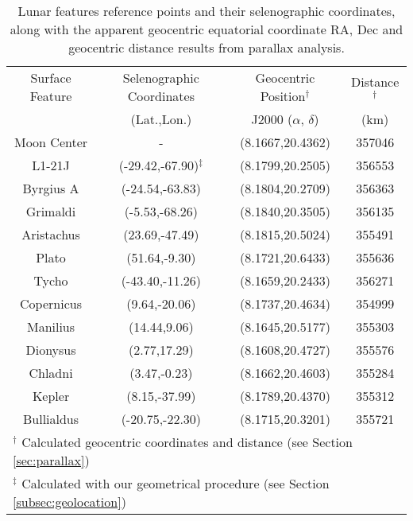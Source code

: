 
\begin{table*}
\centering
\begin{tabular}{cccc}
\hline\hline
Surface Feature & Selenographic Coordinates & Geocentric Position$^\dagger$ & Distance$^\dagger$ \\
                & (Lat.,Lon.)               & J2000 ($\alpha$, $\delta$)      & (km)     \\\hline
Moon Center & - & (8.1667,20.4362) & 357046\\
L1-21J & (-29.42,-67.90)$^\ddagger$ & (8.1799,20.2505) & 356553\\
Byrgius A & (-24.54,-63.83) & (8.1804,20.2709) & 356363\\
Grimaldi & (-5.53,-68.26) & (8.1840,20.3505) & 356135\\
Aristachus & (23.69,-47.49) & (8.1815,20.5024) & 355491\\
Plato & (51.64,-9.30) & (8.1721,20.6433) & 355636\\
Tycho & (-43.40,-11.26) & (8.1659,20.2433) & 356271\\
Copernicus & (9.64,-20.06) & (8.1737,20.4634) & 354999\\
Manilius & (14.44,9.06) & (8.1645,20.5177) & 355303\\
Dionysus & (2.77,17.29) & (8.1608,20.4727) & 355576\\
Chladni & (3.47,-0.23) & (8.1662,20.4603) & 355284\\
Kepler & (8.15,-37.99) & (8.1789,20.4370) & 355312\\
Bullialdus & (-20.75,-22.30) & (8.1715,20.3201) & 355721\\

\hline\hline
\multicolumn{4}{l}{\footnotesize $^\dagger$ Calculated geocentric coordinates and distance (see Section \ref{sec:parallax})}\\
\multicolumn{4}{l}{\footnotesize $^\ddagger$ Calculated with our geometrical procedure (see Section \ref{subsec:geolocation})}\\
\end{tabular}
\caption{Lunar features reference points and their selenographic coordinates, along with the apparent geocentric equatorial coordinate RA, Dec and geocentric distance results from parallax analysis.}
\label{tab:surfacefeatures}
\end{table*}
